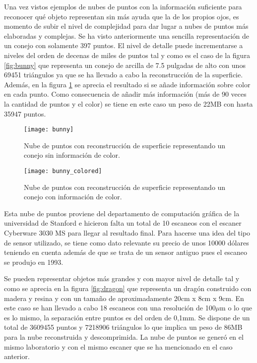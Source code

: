 Una vez vistos ejemplos de nubes de puntos con la información suficiente para reconocer qué objeto representan sin más ayuda que la de los propios ojos, es momento de subir el nivel de complejidad para dar lugar a nubes de puntos más elaboradas y complejas. Se ha visto anteriormente una sencilla representación de un conejo con solamente 397 puntos. El nivel de detalle puede incrementarse a niveles del orden de decenas de miles de puntos tal y como es el caso de la figura \ref{fig:bunny} que representa un conejo de arcilla\cite{pcl_conejo_stanford} de 7.5 pulgadas de alto con unos 69451 triángulos ya que se ha llevado a cabo la reconstrucción de la superficie. Además, en la figura \ref{fig:bunny_colored} se aprecia el resultado si se añade información sobre color en cada punto.
Como consecuencia de añadir más información (más de 90 veces la cantidad de puntos y el color) se tiene en este caso un peso de 22MB con hasta 35947 puntos.
\begin{figure}[!htb]
  \texttt{[image: bunny]}
  \caption{Nube de puntos con reconstrucción de superficie representando un conejo sin información de color.}\label{fig:bunny}
\endminipage\hfill
{}
  \texttt{[image: bunny\_colored]}
  \caption{Nube de puntos con reconstrucción de superficie representando un conejo con información de color.}\label{fig:bunny_colored}
\endminipage\hfill
\end{figure}
Esta nube de puntos proviene del departamento de computación gráfica de la universidad de Stanford e hicieron falta un total de 10 escaneos con el escaner Cyberware 3030 MS\cite{escaner_cyberware} para llegar al resultado final. Para hacerse una idea del tipo de sensor utilizado, se tiene como dato relevante su precio de unos 10000 dólares teniendo en cuenta además de que se trata de un sensor antiguo pues el escaneo se produjo en 1993.


Se pueden representar objetos más grandes y con mayor nivel de detalle tal y como se aprecia en la figura \ref{fig:dragon} que representa un dragón\cite{pcl_conejo_stanford} construido con madera y resina y con un tamaño de aproximadamente 20cm x 8cm x 9cm. En este caso se han llevado a cabo 18 escaneos con una resolución de 100$\mu$m o lo que es lo mismo, la separación entre puntos es del orden de 0,1mm. Se dispone de un total de 3609455 puntos y 7218906 triángulos lo que implica un peso de 86MB para la nube reconstruida y descomprimida.
La nube de puntos se generó en el mismo laboratorio y con el mismo escaner que se ha mencionado en el caso anterior.

